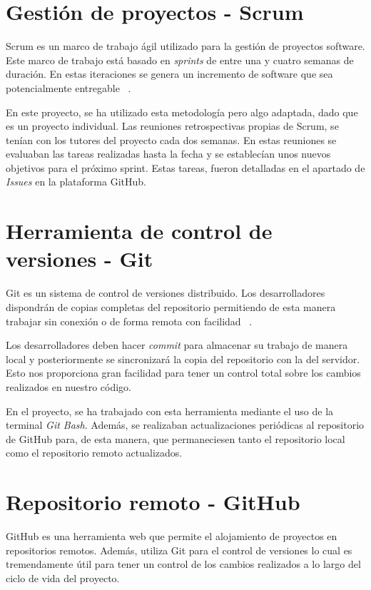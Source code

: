 
\section{Gestión de proyectos - Scrum}
Scrum es un marco de trabajo ágil utilizado para la gestión de proyectos software. Este marco de trabajo está basado en \textit{sprints} de entre una y cuatro semanas de duración. En estas iteraciones se genera un incremento de software que sea potencialmente entregable ~\cite{scrum:latex}.

En este proyecto, se ha utilizado esta metodología pero algo adaptada, dado que es un proyecto individual. Las reuniones retrospectivas propias de Scrum, se tenían con los tutores del proyecto cada dos semanas. En estas reuniones se evaluaban las tareas realizadas hasta la fecha y se establecían unos nuevos objetivos para el próximo sprint. Estas tareas, fueron detalladas en el apartado de \textit{Issues} en la plataforma GitHub.  

\section{Herramienta de control de versiones - Git}
Git es un sistema de control de versiones distribuido. Los desarrolladores dispondrán de copias completas del repositorio permitiendo de esta manera trabajar sin conexión o de forma remota con facilidad ~\cite{git:latex}.

Los desarrolladores deben hacer \textit{commit} para almacenar su trabajo de manera local y posteriormente se sincronizará la copia del repositorio con la del servidor. Esto nos proporciona gran facilidad para tener un control total sobre los cambios realizados en nuestro código.

En el proyecto, se ha trabajado con esta herramienta mediante el uso de la terminal \textit{Git Bash}. Además, se realizaban actualizaciones periódicas al repositorio de GitHub para, de esta manera, que permaneciesen tanto el repositorio local como el repositorio remoto actualizados.

\section{Repositorio remoto - GitHub}
GitHub es una herramienta web que permite el alojamiento de proyectos en repositorios remotos. Además, utiliza Git para el control de versiones lo cual es tremendamente útil para tener un control de los cambios realizados a lo largo del ciclo de vida del proyecto. 

